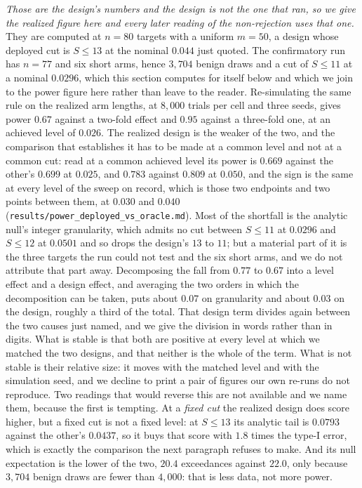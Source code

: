 \emph{Those are the design's numbers and the design is not the one that ran, so we give the
realized figure here and every later reading of the non-rejection uses that one.} They are
computed at $n{=}80$ targets with a uniform $m{=}50$, a design whose deployed cut is
$S{\leq}13$ at the nominal $0.044$ just quoted. The confirmatory run has $n{=}77$ and six
short arms, hence $3{,}704$ benign draws and a cut of $S{\leq}11$ at a nominal $0.0296$,
which this section computes for itself below and which we join to the power figure here
rather than leave to the reader. Re-simulating the same rule on the realized arm lengths, at
$8{,}000$ trials per cell and three seeds, gives power $0.67$ against a two-fold effect and
$0.95$ against a three-fold one, at an achieved level of $0.026$. The realized design is the
weaker of the two, and the comparison that establishes it has to be made at a
common level and not at a common cut: read at a common achieved level its power is $0.669$
against the other's $0.699$ at $0.025$, and $0.783$ against $0.809$ at $0.050$, and the sign
is the same at every level of the sweep on record, which is those two endpoints and two
points between them, at $0.030$ and $0.040$
(\texttt{results/power\_deployed\_vs\_oracle.md}). Most of the shortfall is the analytic
null's integer granularity, which admits no cut between $S{\leq}11$ at $0.0296$ and
$S{\leq}12$ at $0.0501$ and so drops the design's $13$ to $11$; but a material part of it is
the three targets the run could not test and the six short arms, and we do not attribute that
part away. Decomposing the fall from $0.77$ to $0.67$ into a level effect and a design effect,
and averaging the two orders in which the decomposition can be taken, puts about $0.07$ on
granularity and about $0.03$ on the design, roughly a third of the total. That design term
divides again between the two causes just named, and we give the division in words rather
than in digits. What is stable is that both are positive at
every level at which we matched the two designs, and that neither is the whole of the term.
What is not stable is their relative size: it moves with the matched level and with the
simulation seed, and we decline to print a pair of figures our own re-runs do not reproduce.
Two readings that would reverse this are not available and we name them, because the first is
tempting. At a \emph{fixed cut} the realized design does score higher, but a fixed cut is not
a fixed level: at $S{\leq}13$ its analytic tail is $0.0793$ against the other's $0.0437$, so
it buys that score with $1.8$ times the type-I error, which is exactly the comparison the next
paragraph refuses to make. And its null expectation is the lower of the two, $20.4$
exceedances against $22.0$, only because $3{,}704$ benign draws are fewer than $4{,}000$:
that is less data, not more power.

